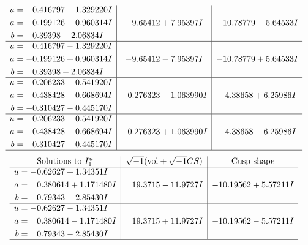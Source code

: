 \documentclass[1p]{elsarticle_modified}
\theoremstyle{definition}
\newcommand{\I}{\sqrt{-1}}
\begin{document}
$$\begin{array}{c|c|c}
\begin{aligned}
u &= \phantom{-}0.416797 + 1.329220 I \\
a &= -0.199126 - 0.960314 I \\
b &= \phantom{-}0.39398 - 2.06834 I\end{aligned}
 & -9.65412 + 7.95397 I & -10.78779 - 5.64533 I \\ \hline\begin{aligned}
u &= \phantom{-}0.416797 - 1.329220 I \\
a &= -0.199126 + 0.960314 I \\
b &= \phantom{-}0.39398 + 2.06834 I\end{aligned}
 & -9.65412 - 7.95397 I & -10.78779 + 5.64533 I \\ \hline\begin{aligned}
u &= -0.206233 + 0.541920 I \\
a &= \phantom{-}0.438428 - 0.668694 I \\
b &= -0.310427 - 0.445170 I\end{aligned}
 & -0.276323 - 1.063990 I & -4.38658 + 6.25986 I \\ \hline\begin{aligned}
u &= -0.206233 - 0.541920 I \\
a &= \phantom{-}0.438428 + 0.668694 I \\
b &= -0.310427 + 0.445170 I\end{aligned}
 & -0.276323 + 1.063990 I & -4.38658 - 6.25986 I\\
 \hline 
 \end{array}$$\newpage$$\begin{array}{c|c|c}  
\text{Solutions to }I^u_{1}& \I (\text{vol} + \sqrt{-1}CS) & \text{Cusp shape}\\
 \hline 
\begin{aligned}
u &= -0.62627 + 1.34351 I \\
a &= \phantom{-}0.380614 + 1.171480 I \\
b &= \phantom{-}0.79343 + 2.85430 I\end{aligned}
 & \phantom{-}19.3715 - 11.9727 I & -10.19562 + 5.57211 I \\ \hline\begin{aligned}
u &= -0.62627 - 1.34351 I \\
a &= \phantom{-}0.380614 - 1.171480 I \\
b &= \phantom{-}0.79343 - 2.85430 I\end{aligned}
 & \phantom{-}19.3715 + 11.9727 I & -10.19562 - 5.57211 I\\
 \hline 
 \end{array}$$\newpage\newpage\renewcommand{\arraystretch}{1}
\end{document}

